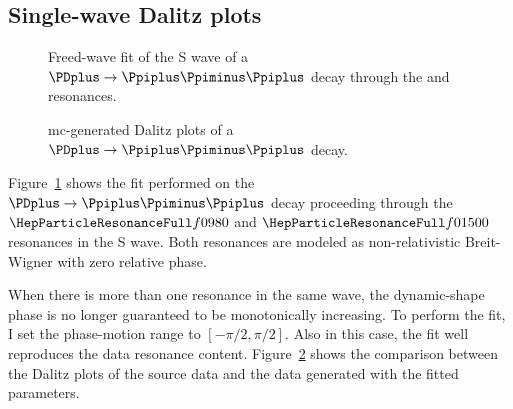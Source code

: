 \subsection{Single-wave Dalitz plots}

    \begin{figure}
        \centering

        \subfloat[][]{}

        \subfloat[][]{}

        \caption{Freed-wave fit of the S wave of a $\PDplus \to \Ppiplus\Ppiminus\Ppiplus$ decay through the \Pfnez{} and \Pfofzz{} resonances.~\Star}
        \label{fig:f0_f2_fit}
    \end{figure}
    \begin{figure}
        \centering


        \caption{\ac{mc}-generated Dalitz plots of a $\PDplus \to \Ppiplus\Ppiminus\Ppiplus$ decay.~\Star}
        \label{fig:f0_f2_dalitz}
    \end{figure}
    Figure~\ref{fig:f0_f2_fit} shows the fit performed on the $\PDplus\to\Ppiplus\Ppiminus\Ppiplus$ decay proceeding through the $\Pfnez{}$ and $\Pfofzz{}$ resonances in the S wave.
    Both resonances are modeled as non-relativistic Breit-Wigner with zero relative phase.


    When there is more than one resonance in the same wave, the dynamic-shape phase is no longer guaranteed to be monotonically increasing.
    To perform the fit, I set the phase-motion range to $[-\pi/2, \pi/2]$.
    Also in this case, the fit well reproduces the data resonance content.
    Figure~\ref{fig:f0_f2_dalitz} shows the comparison between the Dalitz plots of the source data and the data generated with the fitted parameters.

